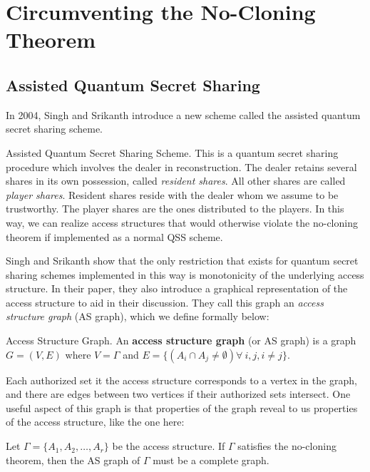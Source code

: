 \section{Circumventing the No-Cloning Theorem}

\subsection{Assisted Quantum Secret Sharing}
\label{ssec:aqss}

In 2004, Singh and Srikanth introduce a new scheme called the assisted quantum secret sharing scheme. 

\begin{definition}{Assisted Quantum Secret Sharing Scheme.}
    \label{defn:aqss}
    This is a quantum secret sharing procedure which involves the dealer in reconstruction. The dealer retains several shares in its own possession, called \textit{resident shares}. All other shares are called \textit{player shares}. Resident shares reside with the dealer whom we assume to be trustworthy. The player shares are the ones distributed to the players. In this way, we can realize access structures that would otherwise violate the no-cloning theorem if implemented as a normal QSS scheme. 
\end{definition}

Singh and Srikanth show that the only restriction that exists for quantum secret sharing schemes implemented in this way is monotonicity of the underlying access structure. In their paper, they also introduce a graphical representation of the access structure to aid in their discussion. They call this graph an \textit{access structure graph} (AS graph), which we define formally below:

\begin{definition}{Access Structure Graph.}
    \label{defn:access-structure-graph}
    An \textbf{access structure graph} (or AS graph) is a graph $G = (V,E)$ where $V = \Gamma$ and $E = \{(A_i \cap A_j \neq \emptyset) \forall\:i,j,i\neq j\}$.
\end{definition}

Each authorized set it the access structure corresponds to a vertex in the graph, and there  are edges between two vertices if their authorized sets intersect. One useful aspect of this graph is that properties of the graph reveal to us properties of the access structure, like the one here:

\begin{proposition}
    \label{prop:complete-as-graph}
    Let $\Gamma = \{A_1,A_2,\dots,A_r\}$ be the access structure. If $\Gamma$ satisfies the no-cloning theorem, then the AS graph of $\Gamma$ must be a complete graph.
\end{proposition}

